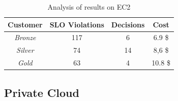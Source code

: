 




\begin{table}
  {\scriptsize 
\begin{center}
    \begin{tabular}{  | c | c | c | c |}
    \hline
         \textbf{Customer}  & \textbf{SLO Violations} & \textbf{Decisions}  & \textbf{Cost}  \\ \hline
   \textit{Bronze}   &  117 &  6 &  6.9 \$ \\ \hline   
   \textit{Silver}  &  74 &  14 &  8,6 \$ \\ \hline   
\textit{Gold} &   63  &  4 &  10.8 \$  \\ \hline   

 \end{tabular}
\end{center}
\vspace{-5mm}
\caption{Analysis of results on EC2}
\label{summaryEC2}
}
\end{table}






\subsection{Private Cloud}


